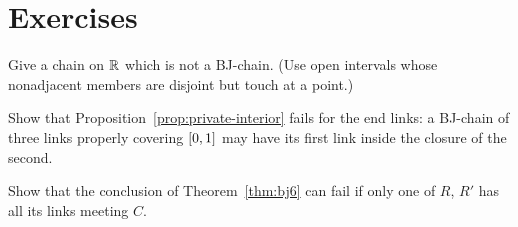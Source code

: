 
\section*{Exercises}

\begin{exercise}
Give a chain on $\mathbb{R}$ which is not a BJ-chain. (Use open intervals whose nonadjacent members are disjoint but touch at a point.)
\end{exercise}

\begin{exercise}
Show that Proposition~\ref{prop:private-interior} fails for the end links: a BJ-chain of three links properly covering $[0,1]$ may have its first link inside
the closure of the second.
\end{exercise}

\begin{exercise}
Show that the conclusion of Theorem~\ref{thm:bj6} can fail if only one of $R$, $R'$ has all its links meeting $C$.
\end{exercise}
